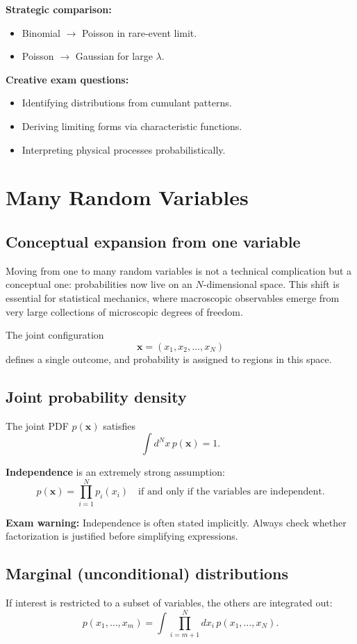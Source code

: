 \documentclass[9pt,twocoloumn]{article}
\begin{document}
\textbf{Strategic comparison:}
\begin{itemize}
\item Binomial $\to$ Poisson in rare-event limit.
\item Poisson $\to$ Gaussian for large $\lambda$.
\end{itemize}

\textbf{Creative exam questions:}
\begin{itemize}
\item Identifying distributions from cumulant patterns.
\item Deriving limiting forms via characteristic functions.
\item Interpreting physical processes probabilistically.
\end{itemize}

\section{Many Random Variables}

\subsection*{Conceptual expansion from one variable}
Moving from one to many random variables is not a technical complication but a conceptual one: probabilities now live on an $N$-dimensional space. This shift is essential for statistical mechanics, where macroscopic observables emerge from very large collections of microscopic degrees of freedom.

The joint configuration
\[
\mathbf{x} = (x_1, x_2, \dots, x_N)
\]
defines a single outcome, and probability is assigned to regions in this space.

\subsection*{Joint probability density}
The joint PDF $p(\mathbf{x})$ satisfies
\[
\int d^N x \, p(\mathbf{x}) = 1.
\]

\textbf{Independence} is an extremely strong assumption:
\[
p(\mathbf{x}) = \prod_{i=1}^N p_i(x_i)
\quad \text{if and only if the variables are independent.}
\]

\textbf{Exam warning:} Independence is often stated implicitly. Always check whether factorization is justified before simplifying expressions.

\subsection*{Marginal (unconditional) distributions}
If interest is restricted to a subset of variables, the others are integrated out:
\[
p(x_1,\dots,x_m) = \int \prod_{i=m+1}^N dx_i \, p(x_1,\dots,x_N).
\]
\end{document}
